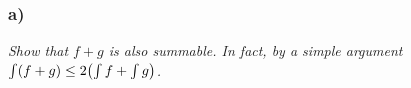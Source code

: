 \documentclass[12pt]{article}
\theoremstyle{plain}
\begin{document}

\subsubsection*{ a)}
\emph{Show that $f + g$ is also summable.  In fact, by a simple argument $\int(f + g) \leq 2\qty(\int f + \int g)$.} \\
\end{document}
